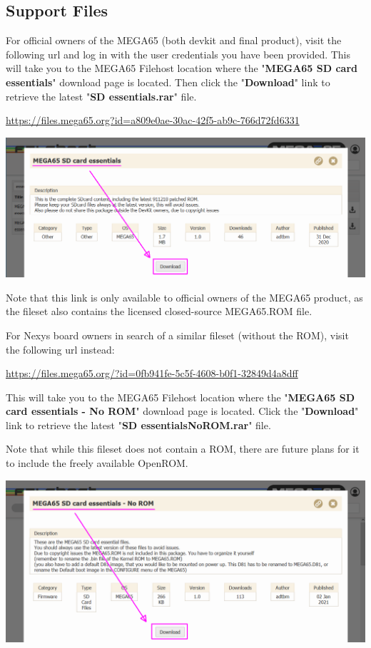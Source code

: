 \subsection{Support Files}

For official owners of the MEGA65 (both devkit and final product), visit the following url and log in with the user credentials you have been provided. This will take you to the MEGA65 Filehost location where the "\textbf{MEGA65 SD card essentials}" download page is located. Then click the "\textbf{Download}" link to retrieve the latest "\textbf{SD essentials.rar}" file. 

\url{https://files.mega65.org?id=a809e0ae-30ac-42f5-ab9c-766d72fd6331}

\includegraphics[width=\linewidth]{images/latest_support_files_with_closedrom.png}

Note that this link is only available to official owners of the MEGA65 product, as the fileset also contains the licensed closed-source MEGA65.ROM file.

For Nexys board owners in search of a similar fileset (without the ROM), visit the following url instead:

\url{https://files.mega65.org/?id=0fb941fe-5c5f-4608-b0f1-32849d4a8dff}

This will take you to the MEGA65 Filehost location where the "\textbf{MEGA65 SD card essentials - No ROM}" download page is located. Click the "\textbf{Download}" link to retrieve the latest "\textbf{SD essentialsNoROM.rar}" file.

Note that while this fileset does not contain a ROM, there are future plans for it to include the freely available OpenROM.

\includegraphics[width=\linewidth]{images/latest_support_files.png}


